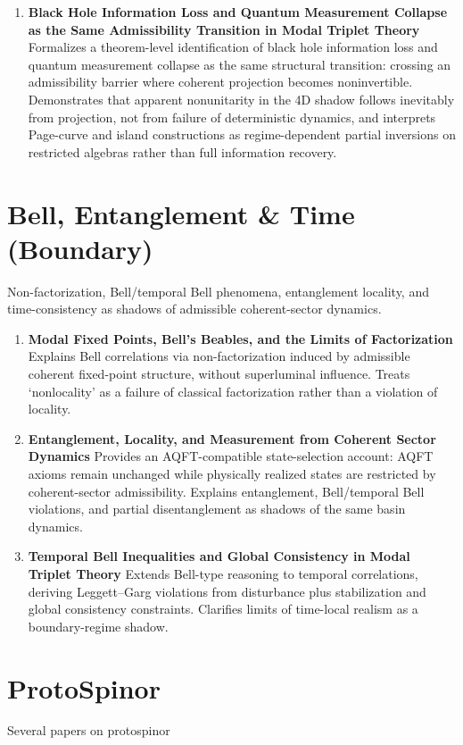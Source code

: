 \documentclass[11pt]{article}
\begin{document}
\begin{enumerate}[leftmargin=*]
\item \textbf{Black Hole Information Loss and Quantum Measurement Collapse as the Same Admissibility Transition in Modal Triplet Theory} 
Formalizes a theorem-level identification of black hole information loss and quantum measurement collapse as the same structural transition: crossing an admissibility barrier where coherent projection becomes noninvertible. Demonstrates that apparent nonunitarity in the 4D shadow follows inevitably from projection, not from failure of deterministic dynamics, and interprets Page-curve and island constructions as regime-dependent partial inversions on restricted algebras rather than full information recovery.



\end{enumerate}

\section{Bell, Entanglement \& Time (Boundary)}
Non-factorization, Bell/temporal Bell phenomena, entanglement locality, and time-consistency as shadows of admissible coherent-sector dynamics.

\begin{enumerate}[leftmargin=*]
\item \textbf{Modal Fixed Points, Bell’s Beables, and the Limits of Factorization} Explains
Bell correlations via non-factorization induced by admissible coherent fixed-point structure, without superluminal influence. Treats ‘nonlocality’ as a failure of classical factorization rather than a violation of locality.
\item \textbf{Entanglement, Locality, and Measurement from Coherent Sector Dynamics} Provides an AQFT-compatible state-selection account: AQFT axioms remain unchanged while physically realized states are restricted by coherent-sector admissibility. Explains entanglement, Bell/temporal Bell violations, and partial disentanglement as shadows of the same basin dynamics.
\item \textbf{Temporal Bell Inequalities and Global Consistency in Modal Triplet Theory} Extends Bell-type reasoning to temporal correlations, deriving Leggett–Garg violations from disturbance plus stabilization and global consistency constraints. Clarifies limits of time-local realism as a boundary-regime shadow.
\end{enumerate}

\section{ProtoSpinor}
Several papers on protospinor
\end{document}

